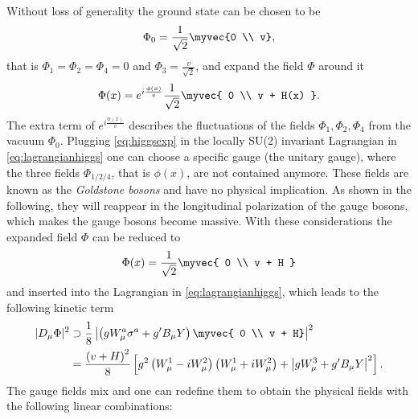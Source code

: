 Without loss of generality the ground state can be chosen to be
\begin{equation}
  \Phi_0 = \frac{1}{\sqrt{2}} \myvec{0 \\ v},
  \label{eq:groundstate}
\end{equation}
that is $\Phi_1 = \Phi_2 = \Phi_4 = 0$ and $\Phi_3 = \frac{v}{\sqrt{2}}$, 
and expand the field $\Phi$ around it
\begin{equation}
  \Phi(x) = e^{i\frac{\phi(x)}{v}}\frac{1}{\sqrt{2}} \myvec{ 0 \\ v + H(x) }.
    \label{eq:higgsexp}
\end{equation}
The extra term of $e^{i\frac{\phi(x)}{v}}$ describes the fluctuations of the fields $\Phi_1, \Phi_2, \Phi_4$ from the vacuum $\Phi_0$.
Plugging \cref{eq:higgsexp} in the locally SU(2) invariant Lagrangian in \cref{eq:lagrangianhiggs} one can choose a specific gauge (the unitary gauge), where the three fields $\Phi_{1/2/4}$, that is $\phi(x)$, are not contained anymore. These fields are known as the \emph{Goldstone bosons} and have no physical implication. As shown in the following, they will reappear in the longitudinal polarization of the gauge bosons, which makes the gauge bosons become massive.
With these considerations the expanded field $\Phi$ can be reduced to
\begin{equation}
  \Phi(x) = \frac{1}{\sqrt{2}} \myvec{ 0 \\ v + H }
  \label{eq:expanded-groundstate}
\end{equation}
and inserted into the Lagrangian in \cref{eq:lagrangianhiggs}, which leads to the following kinetic term
\begin{align}
  |D_\mu\Phi|^2 & \supset \frac{1}{8} \left| \left( gW_\mu^a \sigma^a+g'B_\mu Y \right) \myvec{ 0 \\ v + H} \right|^2  \label{eq:lagrangianmasspre} \\
  &= \frac{ \left( v + H \right) ^2}{8} \left[ g^2 \left( W_\mu^1 - i W_\mu^2 \right) \left( W_\mu^1 + i W_\mu^2 \right) + \left| g W_\mu^3 + g' B_\mu Y \right|^2 \right].
  \label{eq:lagrangianmass}
\end{align}
The gauge fields mix and one can redefine them to obtain the physical fields with the following linear combinations:
